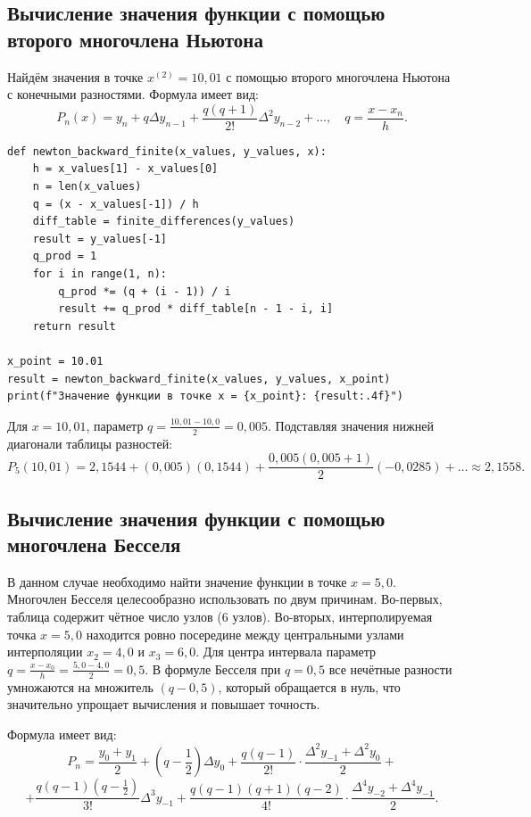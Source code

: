 \documentclass[a4paper, final]{article}
\begin{document}
\subsection{Вычисление значения функции с помощью второго многочлена Ньютона}

Найдём значения в точке $x^{(2)} = 10{,}01$ с помощью второго многочлена Ньютона с конечными разностями. 
Формула имеет вид:
\[
P_n(x) = y_n + q \Delta y_{n-1} + \frac{q(q+1)}{2!} \Delta^2 y_{n-2} + \dots, \quad q = \frac{x - x_n}{h}.
\]

\begin{lstlisting}[caption={Вычисление значения функции с помощью второго многочлена Ньютона с конечными разностями}, label=lst:newton_fin2]
def newton_backward_finite(x_values, y_values, x):
    h = x_values[1] - x_values[0]
    n = len(x_values)
    q = (x - x_values[-1]) / h
    diff_table = finite_differences(y_values)
    result = y_values[-1]
    q_prod = 1
    for i in range(1, n):
        q_prod *= (q + (i - 1)) / i
        result += q_prod * diff_table[n - 1 - i, i]
    return result

x_point = 10.01
result = newton_backward_finite(x_values, y_values, x_point)
print(f"Значение функции в точке x = {x_point}: {result:.4f}")
\end{lstlisting}

Для $x = 10{,}01$, параметр $q = \frac{10{,}01 - 10{,}0}{2} = 0{,}005$. Подставляя значения нижней диагонали таблицы разностей:
\[
P_5(10{,}01) = 2{,}1544 + (0{,}005)(0{,}1544) + \frac{0{,}005(0{,}005 + 1)}{2}(-0{,}0285) + \dots \approx 2{,}1558.
\]

\subsection{Вычисление значения функции с помощью многочлена Бесселя}

В данном случае необходимо найти значение функции в точке $x = 5{,}0$. Многочлен Бесселя целесообразно использовать по двум причинам. Во-первых, таблица содержит чётное число узлов (6 узлов). Во-вторых, интерполируемая точка $x = 5{,}0$ находится ровно посередине между центральными узлами интерполяции $x_2 = 4{,}0$ и $x_3 = 6{,}0$. Для центра интервала параметр $q = \frac{x - x_0}{h} = \frac{5{,}0 - 4{,}0}{2} = 0{,}5$. В формуле Бесселя при $q = 0{,}5$ все нечётные разности умножаются на множитель $(q - 0{,}5)$, который обращается в нуль, что значительно упрощает вычисления и повышает точность.

Формула имеет вид:
\[
P_n = \frac{y_0 + y_1}{2} + \left(q - \frac{1}{2}\right)\Delta y_0
+ \frac{q(q-1)}{2!} \cdot \frac{\Delta^2 y_{-1} + \Delta^2 y_0}{2} + 
\]
\[
+ \frac{q(q-1)(q-\frac{1}{2})}{3!}\Delta^3 y_{-1}
+ \frac{q(q-1)(q+1)(q-2)}{4!} \cdot \frac{\Delta^4 y_{-2} + \Delta^4 y_{-1}}{2}.
\]
\end{document}
